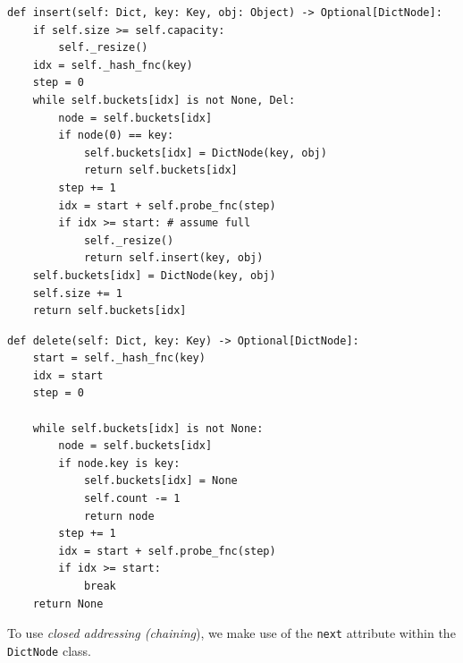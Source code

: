 \documentclass[mathserif, handout]{beamer}
\begin{document}
\begin{frame}[fragile]
	\begin{proofbox}
		\begin{lstlisting}[style=mypython]
def insert(self: Dict, key: Key, obj: Object) -> Optional[DictNode]:
    if self.size >= self.capacity:
        self._resize()
    idx = self._hash_fnc(key)
    step = 0
    while self.buckets[idx] is not None, Del:
        node = self.buckets[idx]
        if node(0) == key:
            self.buckets[idx] = DictNode(key, obj)
            return self.buckets[idx]
        step += 1
        idx = start + self.probe_fnc(step)
        if idx >= start: # assume full
            self._resize()
            return self.insert(key, obj)
    self.buckets[idx] = DictNode(key, obj)
    self.size += 1
    return self.buckets[idx]
\end{lstlisting}
	\end{proofbox}
\end{frame}

\begin{frame}[fragile]
	\begin{proofbox}
		\begin{lstlisting}[style=mypython]
def delete(self: Dict, key: Key) -> Optional[DictNode]:
    start = self._hash_fnc(key)
    idx = start
    step = 0
    
    while self.buckets[idx] is not None:
        node = self.buckets[idx]
        if node.key is key:
            self.buckets[idx] = None
            self.count -= 1
            return node
        step += 1
        idx = start + self.probe_fnc(step)
        if idx >= start:
            break
    return None
\end{lstlisting}
	\end{proofbox}
\end{frame}

\begin{frame}[fragile]
	To use \textit{closed addressing (chaining}), we make use of the \texttt{next} attribute within the \texttt{DictNode} class.
\end{frame}
\end{document}
